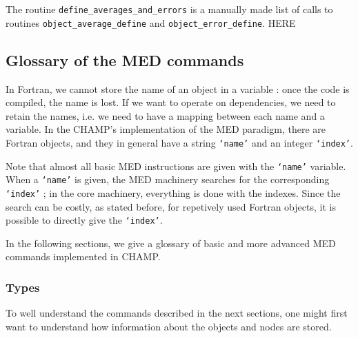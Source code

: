 \documentclass[letter,11pt]{article}
\begin{document}
The routine {\tt define_averages_and_errors} is a manually made list of calls to routines {\tt object_average_define} and {\tt object_error_define}.
HERE

\subsection{Glossary of the MED commands}

In Fortran, we cannot store the name of an object in a variable : once the code is compiled, the name is lost.
If we want to operate on dependencies, we need to retain the names, i.e. we need to have a mapping between each name and a variable.
In the CHAMP's implementation of the MED paradigm, there are Fortran objects, and they in general have a string {\tt `name'} and an integer {\tt `index'}.

Note that almost all basic MED instructions are given with the {\tt `name'} variable.
When a {\tt `name'} is given, the MED machinery searches for the corresponding {\tt `index'} ; in the core machinery, everything is done with the indexes.
Since the search can be costly, as stated before, for repetively used Fortran objects, it is possible to directly give the {\tt `index'}.

In the following sections, we give a glossary of basic and more advanced MED commands implemented in CHAMP.

\subsubsection{Types}
\label{subsub:types}

To well understand the commands described in the next sections, one might first want to understand how information about the objects and nodes are stored.
\end{document}
